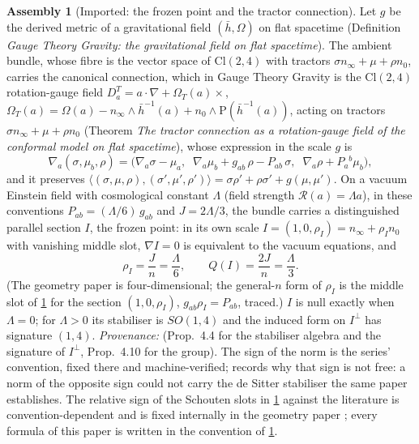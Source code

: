 \documentclass[11pt]{article}
\theoremstyle{definition}
\newtheorem{assembled}[theorem]{Assembly}
\theoremstyle{plain}
\newcommand{\changedmark}[2]{\marginpar{\raggedright\scriptsize\color{#1}#2}}
\providecommand{\Cl}{}\renewcommand{\Cl}{\mathrm{Cl}}
\providecommand{\Sch}{}\renewcommand{\Sch}{\mathrm{P}}
\providecommand{\hb}{}\renewcommand{\hb}{\bar{h}}
\providecommand{\nInf}{}\renewcommand{\nInf}{n_\infty}
\providecommand{\nO}{}\renewcommand{\nO}{n_0}
\providecommand{\ip}{}\renewcommand{\ip}[2]{\langle #1, #2\rangle}
\begin{document}
\begin{assembled}[Imported: the frozen point and the tractor connection]\label{c:mass.imported-frozen-point-tractor-connection}
\changedmark{gray}{reworded}
Let $g$ be the derived metric of a gravitational field $(\hb, \Omega)$ on flat spacetime (Definition \emph{Gauge Theory Gravity: the gravitational field on flat spacetime}). The ambient bundle, whose fibre is the vector space of $\Cl(2,4)$ with tractors $\sigma\nInf + \mu + \rho\nO$, carries the canonical connection, which in Gauge Theory Gravity is the $\Cl(2,4)$ rotation-gauge field $D^{T}_{a} = a \cdot \nabla + \Omega_{T}(a)\times$, $\Omega_{T}(a) = \Omega(a) - \nInf \wedge \hb^{-1}(a) + \nO \wedge \Sch(\hb^{-1}(a))$, acting on tractors $\sigma\nInf + \mu + \rho\nO$ (Theorem \emph{The tractor connection as a rotation-gauge field of the conformal model on flat spacetime}), whose expression in the scale $g$ is
\begin{equation}
\nabla_{a}(\sigma, \mu_{b}, \rho) = \bigl(\nabla_{a}\sigma - \mu_{a},\;\; \nabla_{a}\mu_{b} + g_{ab}\,\rho - P_{ab}\,\sigma,\;\; \nabla_{a}\rho + P_{a}{}^{b}\mu_{b}\bigr),
\end{equation}
and it preserves $\ip{(\sigma,\mu,\rho)}{(\sigma',\mu',\rho')} = \sigma\rho' + \rho\sigma' + g(\mu,\mu')$. On a vacuum Einstein field with cosmological constant $\Lambda$ (field strength $\mathcal{R}(a) = \Lambda a$), in these conventions $P_{ab} = (\Lambda/6)\,g_{ab}$ and $J = 2\Lambda/3$, the bundle carries a distinguished parallel section $I$, the frozen point: in its own scale $I = (1, 0, \rho_{I}) = \nInf + \rho_{I}\nO$ with vanishing middle slot, $\nabla I = 0$ is equivalent to the vacuum equations, and
\[
\rho_{I} = \frac{J}{n} = \frac{\Lambda}{6}, \qquad Q(I) = \frac{2J}{n} = \frac{\Lambda}{3}.
\]
(The geometry paper is four-dimensional; the general-$n$ form of $\rho_{I}$ is the middle slot of \ref{c:mass.imported-frozen-point-tractor-connection} for the section $(1, 0, \rho_{I})$, $g_{ab}\rho_{I} = P_{ab}$, traced.) $I$ is null exactly when $\Lambda = 0$; for $\Lambda > 0$ its stabiliser is $SO(1,4)$ and the induced form on $I^{\perp}$ has signature $(1,4)$. \emph{Provenance:} \cite[Fact~4.1, Prop.~4.4, Thm.~4.5, Thm.~4.7, Prop.~4.10]{ButlerT6} (Prop.~4.4 for the stabiliser algebra and the signature of $I^{\perp}$, Prop.~4.10 for the group). The sign of the norm is the series' convention, fixed there and machine-verified; \cite[Rem.~4.9]{ButlerT6} records why that sign is not free: a norm of the opposite sign could not carry the de Sitter stabiliser the same paper establishes. The relative sign of the Schouten slots in \ref{c:mass.imported-frozen-point-tractor-connection} against the literature is convention-dependent and is fixed internally in the geometry paper \cite[Lem.~4.8]{ButlerT6}; every formula of this paper is written in the convention of \ref{c:mass.imported-frozen-point-tractor-connection}.
\end{assembled}
\end{document}
